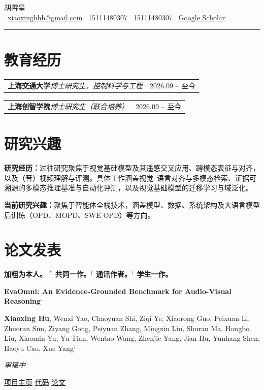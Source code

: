 \documentclass[a4paper,11pt]{ctexart}
\makeatletter
\let\oldSection\section
\renewcommand{\section}[1]{\needspace{5\baselineskip}\oldSection{#1}}
\newcommand{\entry}[4]{%
  \begin{tabularx}{\textwidth}{@{}X r@{}}
    {\bfseries #1}\hfill{\kaiti\itshape\color{muted}#2} & {\kaiti\small\color{muted}#3}
  \end{tabularx}%
  \par\vspace{1.5pt}%
  \if\relax\detokenize{#4}\relax\else{\kaiti\small #4}\par\fi
  \vspace{0.55em}%
}
\newcommand{\pub}[4]{%
  \needspace{4\baselineskip}%
  \vspace{0.32em}%
  {\bfseries #1}\par\vspace{0.5pt}%
  {\kaiti\small #2}\par\vspace{0.5pt}%
  {\kaiti\small\itshape\color{accent}#3}\par\vspace{0.5pt}%
  {\kaiti\footnotesize\color{muted}#4}\par
}
\makeatother
\begin{document}
\begin{center}
  {\xingkai\fontsize{34}{40}\selectfont 胡霄星}\\[8pt]
  {\small
    \faEnvelope\ \href{mailto:xiaoxinghhh@gmail.com}{xiaoxinghhh@gmail.com}\quad
    \faPhone\ 15111480307\quad
    \faWeixin\ 15111480307\quad
    \faGoogle\ \href{https://scholar.google.com/citations?user=zBM8_XkAAAAJ&hl=zh-CN}{Google Scholar}
  }
\end{center}

\vspace{-0.35em}
{\color{rule}\rule{\textwidth}{0.6pt}}

\section{教育经历}

\entry{上海交通大学}{博士研究生，控制科学与工程}{2026.09 -- 至今}
  {}

\entry{上海创智学院}{博士研究生（联合培养）}{2026.09 -- 至今}
  {}

\section{研究兴趣}

{\xhei\bfseries 研究经历：}过往研究聚焦于视觉基础模型及其遥感交叉应用、跨模态表征与对齐，以及（音）视频理解与评测。具体工作涵盖视觉--语言对齐与多模态检索、证据可溯源的多模态推理基准与自动化评测，以及视觉基础模型的迁移学习与域泛化。

\vspace{0.45em}
{\xhei\bfseries 当前研究兴趣：}聚焦于智能体全栈技术，涵盖模型、数据、系统架构及大语言模型后训练（OPD、MOPD、SWE-OPD）等方向。

\section{论文发表}
{\xhei\bfseries\footnotesize\color{muted}加粗为本人。\quad
 $^{*}$ 共同一作。\quad $^{\dagger}$ 通讯作者。\quad $^{\ddagger}$ 学生一作。\par}
\vspace{0.2em}

\pub{EvaOmni: An Evidence-Grounded Benchmark for Audio-Visual Reasoning}
  {\textbf{Xiaoxing Hu}, Wenxi Yao, Chaoyuan Shi, Ziqi Ye, Xiaorong Guo, Peixuan Li, Zhuoran Sun,
   Ziyang Gong, Peiyuan Zhang, Mingxin Liu, Shuran Ma, Hongbo Liu, Xiaomin Yu, Yu Tian, Wentao Wang,
   Zhenjie Yang, Jian Hu, Yunhang Shen, Haoyu Cao, Xue Yang$^{\dagger}$}
  {审稿中}
  {\href{https://xiaoxing2001.github.io/EvaOmni.github.io/}{项目主页}\quad
   \href{https://github.com/VisionXLab/EvaOmni}{代码}\quad
   \href{https://arxiv.org/abs/2610.28444}{论文}}
\end{document}
